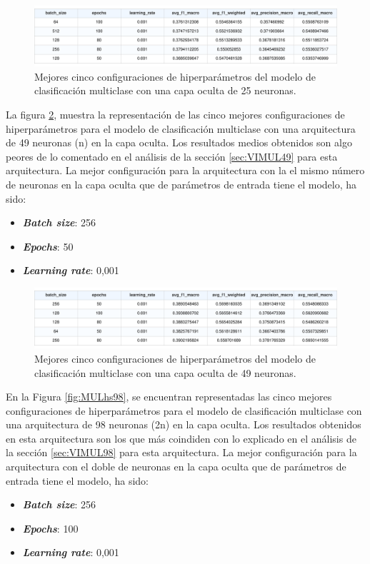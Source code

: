 \begin{figure}[H]
    \centering
    \includegraphics[width=1\textwidth]{./img/modelo/MULhs25.pdf}
    \caption{Mejores cinco configuraciones de hiperparámetros del modelo de clasificación multiclase con una capa oculta de 25 neuronas.}
    \label{fig:MULhs25}
\end{figure}



La figura \ref{fig:MULhs49}, muestra la representación de las cinco mejores configuraciones de hiperparámetros para el modelo de clasificación multiclase con una arquitectura de 49 neuronas (n) en la capa oculta. Los resultados medios obtenidos son algo peores de lo comentado en el análisis de la sección \ref{sec:VIMUL49} para esta arquitectura. La mejor configuración para la arquitectura con la el mismo número de neuronas en la capa oculta que de parámetros de entrada tiene el modelo, ha sido:
\begin{itemize}
	\item \textbf{\textit{Batch size}}: 256
	\item \textbf{\textit{Epochs}}: 50
	\item \textbf{\textit{Learning rate}}: 0,001
\end{itemize}

\begin{figure}[H]
    \centering
    \includegraphics[width=1\textwidth]{./img/modelo/MULhs49.pdf}
    \caption{Mejores cinco configuraciones de hiperparámetros del modelo de clasificación multiclase con una capa oculta de 49 neuronas.}
    \label{fig:MULhs49}
\end{figure}


En la Figura \ref{fig:MULhs98}, se encuentran representadas las cinco mejores configuraciones de hiperparámetros para el modelo de clasificación multiclase con una arquitectura de 98 neuronas (2n) en la capa oculta. Los resultados obtenidos en esta arquitectura son los que más coindiden con lo explicado en el análisis de la sección \ref{sec:VIMUL98} para esta arquitectura. La mejor configuración para la arquitectura con el doble de neuronas en la capa oculta que de parámetros de entrada tiene el modelo, ha sido:
\begin{itemize}
	\item \textbf{\textit{Batch size}}: 256
	\item \textbf{\textit{Epochs}}: 100
	\item \textbf{\textit{Learning rate}}: 0,001
\end{itemize}

